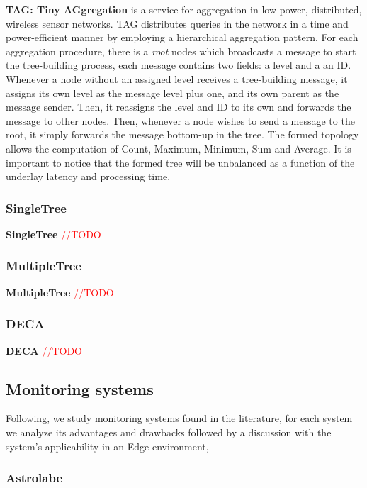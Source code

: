 \textbf{TAG: Tiny AGgregation}\cite{Madden2002} is a service for aggregation in low-power, distributed, wireless sensor networks. TAG distributes queries in the network in a time and power-efficient manner by employing a hierarchical aggregation pattern. For each aggregation procedure, there is a \textit{root} nodes which broadcasts a message to start the tree-building process, each message contains two fields: a level and a an ID. Whenever a node without an assigned level receives a tree-building message, it assigns its own level as the message level plus one, and its own parent as the message sender. Then, it reassigns the level and ID to its own and forwards the message to other nodes. Then, whenever a node wishes to send a message to the root, it simply forwards the message bottom-up in the tree. The formed topology allows the computation of Count, Maximum, Minimum, Sum and Average. It is important to notice that the formed tree will be unbalanced as a function of the underlay latency and processing time.

\subsubsection{SingleTree} 

\textbf{SingleTree} \cite{} \textcolor{red}{//TODO}

\subsubsection{MultipleTree} 

\textbf{MultipleTree} \cite{} \textcolor{red}{//TODO}

\subsubsection{DECA} \textbf{DECA} \cite{Artigas2006} \textcolor{red}{//TODO}

\subsection{Monitoring systems}

Following, we study monitoring systems found in the literature, for each system we analyze its advantages and drawbacks followed by a discussion with the system's applicability in an Edge environment,

\subsubsection{Astrolabe}

